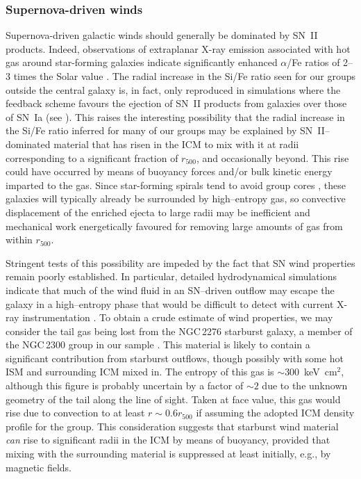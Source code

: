 \documentclass[useAMS,usenatbib]{mn2e}
\begin{document}
\subsubsection{Supernova-driven winds}

Supernova-driven galactic winds should generally be dominated by SN~II
products. Indeed, observations of extraplanar X-ray emission
associated with hot gas around star-forming galaxies indicate
significantly enhanced $\alpha$/Fe ratios of 2--3 times the Solar
value \citep{stri04}. The radial increase in the Si/Fe ratio seen for
our groups outside the central galaxy is, in fact, only reproduced in
simulations where the feedback scheme favours the ejection of SN~II
products from galaxies over those of SN~Ia (see
\citealt{torn04,rome06}). This raises the interesting possibility that
the radial increase in the Si/Fe ratio inferred for many of our groups
may be explained by SN~II--dominated material that has risen in the
ICM to mix with it at radii corresponding to a significant fraction of
$r_{500}$, and occasionally beyond. This rise could have occurred by
means of buoyancy forces and/or bulk kinetic energy imparted to the
gas.  Since star-forming spirals tend to avoid group cores
\citep{hels03}, these galaxies will typically already be surrounded by
high--entropy gas, so convective displacement of the enriched ejecta
to large radii may be inefficient and mechanical work energetically
favoured for removing large amounts of gas from within $r_{500}$.

Stringent tests of this possibility are impeded by the fact that SN
wind properties remain poorly established. In particular, detailed
hydrodynamical simulations indicate that much of the wind fluid in an
SN--driven outflow may escape the galaxy in a high--entropy phase that
would be difficult to detect with current X-ray instrumentation
\citep{stri00}. To obtain a crude estimate of wind properties, we may
consider the tail gas being lost from the NGC\,2276 starburst galaxy,
a member of the NGC\,2300 group in our sample \citep{rasm06}. This
material is likely to contain a significant contribution from
starburst outflows, though possibly with some hot ISM and surrounding
ICM mixed in. The entropy of this gas is $\sim 300$~keV~cm$^2$,
although this figure is probably uncertain by a factor of $\sim 2$ due
to the unknown geometry of the tail along the line of sight. Taken at
face value, this gas would rise due to convection to at least $r \sim
0.6r_{500}$ if assuming the adopted ICM density profile for the group.
This consideration suggests that starburst wind material {\em can}
rise to significant radii in the ICM by means of buoyancy, provided
that mixing with the surrounding material is suppressed at least
initially, e.g., by magnetic fields.
\end{document}
